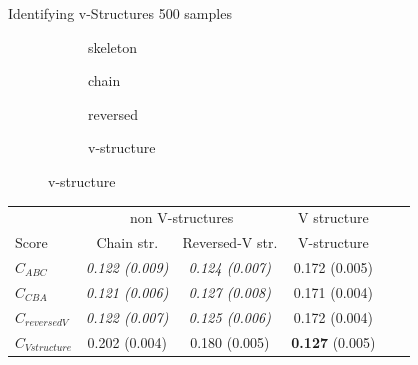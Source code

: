 \documentclass{beamer}
\begin{document}
\begin{frame}{Identifying v-Structures}
	500 samples
	\begin{figure}
		\begin{subfigure}{.24\linewidth}
			\scalebox{0.8}{}
			\caption{skeleton}\label{fig:skeleton-v}
		\end{subfigure}
		\hfill
		\begin{subfigure}{.24\linewidth}
			\scalebox{0.8}{}
			\caption{chain}\label{fig:chain-v}
		\end{subfigure}
		\hfill
		\begin{subfigure}{.24\linewidth}
			\scalebox{0.8}{}
			\caption{reversed}\label{fig:rev-v}
		\end{subfigure}
		\hfill
		\begin{subfigure}{.24\linewidth}
			\scalebox{0.8}{}
			\caption{v-structure}\label{fig:v}
		\end{subfigure}
	\end{figure}
	\begin{table}[!h]
		\label{table:acc_graph}
		\centering
		\begin{tabular}{l|cc|ccc}
			\toprule

			                       & \multicolumn{2}{c|}{non V-structures} & V structure \\
			Score                  & Chain str.                            &
			Reversed-V str.        & V-structure                                         \\
			\midrule
			$C_{ABC}$              & \textit{0.122 (0.009)}                &
			\textit{0.124 (0.007)} & 0.172 (0.005)                                       \\
			$C_{CBA}$              & \textit{0.121 (0.006)}                &
			\textit{0.127 (0.008)} & 0.171 (0.004)                                       \\
			$C_{reversed V}$       & \textit{0.122 (0.007)}                &
			\textit{0.125 (0.006)} & 0.172 (0.004)                                       \\ \hline
			$C_{Vstructure}$       & 0.202 (0.004)                         &
			0.180 (0.005)          & \textbf{0.127} (0.005)                              \\
		\end{tabular}
	\end{table}
\end{frame}
\end{document}
